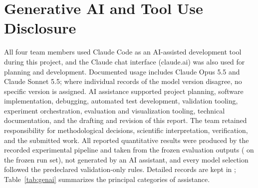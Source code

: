 \documentclass[10pt,journal,compsoc]{IEEEtran}
\begin{document}
\section{Generative AI and Tool Use Disclosure}\label{app:genai}
All four team members used Claude Code as an AI-assisted development tool during this project, and the Claude chat interface (claude.ai) was also used for planning and development. Documented usage includes Claude Opus 5.5 and Claude Sonnet 5.5; where individual records of the model version disagree, no specific version is assigned. AI assistance supported project planning, software implementation, debugging, automated test development, validation tooling, experiment orchestration, evaluation and visualization tooling, technical documentation, and the drafting and revision of this report. The team retained responsibility for methodological decisions, scientific interpretation, verification, and the submitted work. All reported quantitative results were produced by the recorded experimental pipeline and taken from the frozen evaluation outputs ( on the frozen run set), not generated by an AI assistant, and every model selection followed the predeclared validation-only rules. Detailed records are kept in ; Table~\ref{tab:genai} summarizes the principal categories of assistance.
\end{document}
